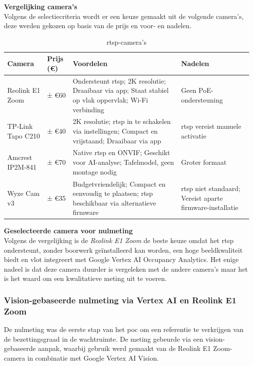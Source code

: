 \textbf{Vergelijking camera's} \\
Volgens de selectiecriteria wordt er een keuze gemaakt uit de volgende camera's, deze werden gekozen op basis van de prijs en voor- en nadelen.
\begin{table}[h!]
    \centering
    \caption{\gls{rtsp}-camera's}
    \begin{tabular}{|p{3.5cm}|p{1.8cm}|p{6cm}|p{3cm}|}
        \hline
        \textbf{Camera} & \textbf{Prijs (€)} & \textbf{Voordelen} & \textbf{Nadelen} \\
        \hline
        Reolink E1 Zoom & ± €60 & Ondersteunt \gls{rtsp}; 2K resolutie; Draaibaar via app; Staat stabiel op vlak oppervlak; Wi-Fi verbinding & Geen PoE-ondersteuning \\
        \hline
        TP-Link Tapo C210 & ± €40 & 2K resolutie; \gls{rtsp} in te schakelen via instellingen; Compact en vrijstaand; Draaibaar via app & \gls{rtsp} vereist manuele activatie \\
        \hline
        Amcrest IP2M-841 & ± €70 & Native \gls{rtsp} en ONVIF; Geschikt voor AI-analyse; Tafelmodel, geen montage nodig & Groter formaat \\
        \hline
        Wyze Cam v3 & ± €35 & Budgetvriendelijk; Compact en eenvoudig te plaatsen; \gls{rtsp} beschikbaar via alternatieve firmware & \gls{rtsp} niet standaard; Vereist aparte firmware-installatie \\
        \hline
    \end{tabular}
    \label{tab:rtsp-cams}
\end{table}


\textbf{Geselecteerde camera voor nulmeting} \\
Volgens de vergelijking is de \textit{Reolink E1 Zoom} de beste keuze omdat het \gls{rtsp} ondersteunt, zonder boorwerk geïnstalleerd kan worden, een hoge beeldkwaliteit biedt en vlot integreert met Google Vertex AI Occupancy Analytics. Het enige nadeel is dat deze camera duurder is vergeleken met de andere camera's maar het is het waard om een kwalitatieve meting uit te voeren.

\subsubsection{Vision-gebaseerde nulmeting via Vertex AI en Reolink E1 Zoom}
De nulmeting was de eerste stap van het \gls{poc} om een referentie te verkrijgen van de bezettingsgraad in de wachtruimte. De meting gebeurde via een vision-gebaseerde aanpak, waarbij gebruik werd gemaakt van de Reolink E1 Zoom-camera in combinatie met Google Vertex AI Vision. \\

